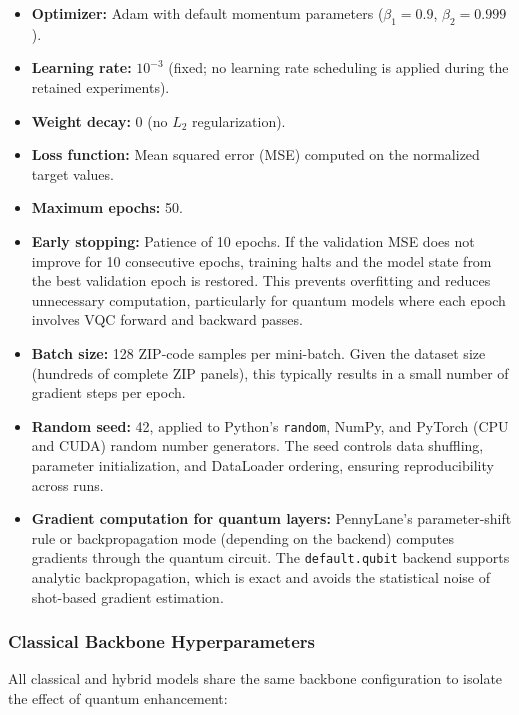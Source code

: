 \documentclass[11pt]{article}
\begin{document}
\begin{itemize}
  \item \textbf{Optimizer:} Adam with default momentum parameters ($\beta_1 = 0.9$, $\beta_2 = 0.999$).
  \item \textbf{Learning rate:} $10^{-3}$ (fixed; no learning rate scheduling is applied during the retained experiments).
  \item \textbf{Weight decay:} $0$ (no $L_2$ regularization).
  \item \textbf{Loss function:} Mean squared error (MSE) computed on the normalized target values.
  \item \textbf{Maximum epochs:} 50.
  \item \textbf{Early stopping:} Patience of 10 epochs. If the validation MSE does not improve for 10 consecutive epochs, training halts and the model state from the best validation epoch is restored. This prevents overfitting and reduces unnecessary computation, particularly for quantum models where each epoch involves VQC forward and backward passes.
  \item \textbf{Batch size:} 128 ZIP-code samples per mini-batch. Given the dataset size (hundreds of complete ZIP panels), this typically results in a small number of gradient steps per epoch.
  \item \textbf{Random seed:} 42, applied to Python's \texttt{random}, NumPy, and PyTorch (CPU and CUDA) random number generators. The seed controls data shuffling, parameter initialization, and DataLoader ordering, ensuring reproducibility across runs.
  \item \textbf{Gradient computation for quantum layers:} PennyLane's parameter-shift rule or backpropagation mode (depending on the backend) computes gradients through the quantum circuit. The \texttt{default.qubit} backend supports analytic backpropagation, which is exact and avoids the statistical noise of shot-based gradient estimation.
\end{itemize}

\subsubsection*{Classical Backbone Hyperparameters}

All classical and hybrid models share the same backbone configuration to isolate the effect of quantum enhancement:
\end{document}
